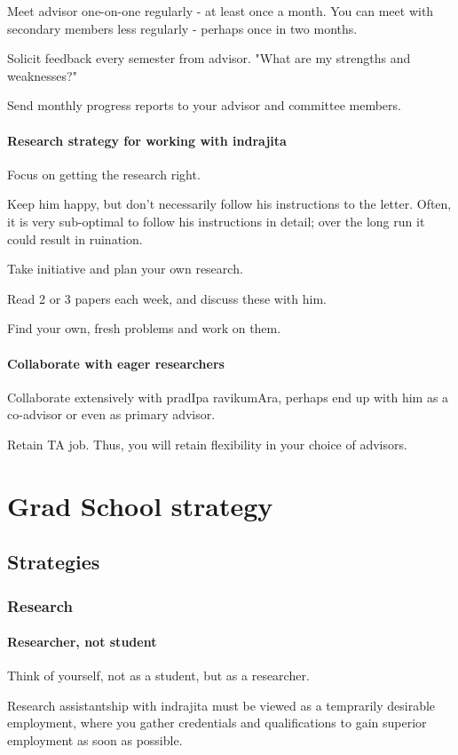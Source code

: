 \documentclass[oneside, article]{memoir}
\begin{document}
Meet advisor one-on-one regularly - at least once a month. You can meet with secondary members less regularly - perhaps once in two months.

Solicit feedback every semester from advisor. "What are my strengths and weaknesses?"

Send monthly progress reports to your advisor and committee members.

\subsection{Research strategy for working with indrajita}
Focus on getting the research right.

Keep him happy, but don't necessarily follow his instructions to the letter. Often, it is very sub-optimal to follow his instructions in detail; over the long run it could result in ruination.

Take initiative and plan your own research.

Read 2 or 3 papers each week, and discuss these with him.

Find your own, fresh problems and work on them.

\subsection{Collaborate with eager researchers}
Collaborate extensively with pradIpa ravikumAra, perhaps end up with him as a co-advisor or even as primary advisor.

Retain TA job. Thus, you will retain flexibility in your choice of advisors.

\part{Grad School strategy}
\chapter{Strategies}
\section{Research}
\subsection{Researcher, not student}
Think of yourself, not as a student, but as a researcher.

Research assistantship with indrajita must be viewed as a temprarily desirable employment, where you gather credentials and qualifications to gain superior employment as soon as possible.
\end{document}
